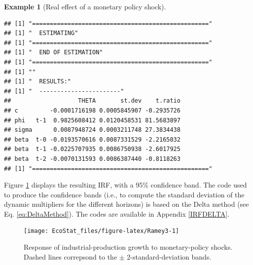 \documentclass[
  12pt,
]{book}
\newenvironment{Shaded}{\begin{snugshade}}{\end{snugshade}}
\newcommand{\AttributeTok}[1]{\textcolor[rgb]{0.77,0.63,0.00}{#1}}
\newcommand{\CommentTok}[1]{\textcolor[rgb]{0.56,0.35,0.01}{\textit{#1}}}
\newcommand{\ConstantTok}[1]{\textcolor[rgb]{0.00,0.00,0.00}{#1}}
\newcommand{\DecValTok}[1]{\textcolor[rgb]{0.00,0.00,0.81}{#1}}
\newcommand{\FunctionTok}[1]{\textcolor[rgb]{0.00,0.00,0.00}{#1}}
\newcommand{\NormalTok}[1]{#1}
\newcommand{\OtherTok}[1]{\textcolor[rgb]{0.56,0.35,0.01}{#1}}
\newcommand{\SpecialCharTok}[1]{\textcolor[rgb]{0.00,0.00,0.00}{#1}}
\theoremstyle{definition}
\theoremstyle{definition}
\newtheorem{example}{Example}[chapter]
\theoremstyle{definition}
\theoremstyle{definition}
\theoremstyle{remark}
\begin{document}
\begin{example}[Real effect of a monetary policy shock]
\begin{Shaded}
\end{Shaded}

\begin{verbatim}
## [1] "=================================================="
## [1] "  ESTIMATING"
## [1] "=================================================="
## [1] "  END OF ESTIMATION"
## [1] "=================================================="
## [1] ""
## [1] "  RESULTS:"
## [1] "  -----------------------"
##                   THETA       st.dev    t.ratio
## c         -0.0001716198 0.0005845907 -0.2935726
## phi   t-1  0.9825608412 0.0120458531 81.5683897
## sigma      0.0087948724 0.0003211748 27.3834438
## beta  t-0 -0.0193570616 0.0087331529 -2.2165032
## beta  t-1 -0.0225707935 0.0086750938 -2.6017925
## beta  t-2 -0.0070131593 0.0086387440 -0.8118263
## [1] "=================================================="
\end{verbatim}

\begin{Shaded}
\end{Shaded}

Figure \ref{fig:Ramey3} displays the resulting IRF, with a 95\% confidence band. The code used to produce the confidence bands (i.e., to compute the standard deviation of the dynamic multipliers for the different horizons) is based on the Delta method (see Eq. \eqref{eq:DeltaMethod}). The codes are available in Appendix \ref{IRFDELTA}.

\begin{figure}
\texttt{[image: EcoStat\_files/figure-latex/Ramey3-1]} \caption{Response of industrial-production growth to monetary-policy shocks. Dashed lines correpsond to the $\pm$  2-standard-deviation bands.}\label{fig:Ramey3}
\end{figure}

\end{example}
\end{document}
